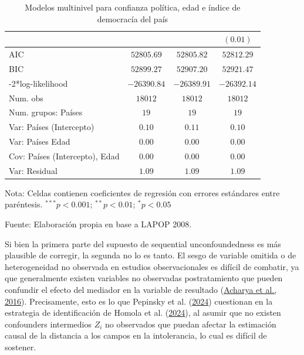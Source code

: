 \documentclass[
  12pt,
  a4paper,
]{article}
\begin{document}
\begin{table}[h!]
\begin{center}
{\begin{threeparttable}
\begin{tabular}{l c c c}
                               &               &               & $(0.01)$      \\
\midrule
AIC                            & $52805.69$    & $52805.82$    & $52812.29$    \\
BIC                            & $52899.27$    & $52907.20$    & $52921.47$    \\
-2*log-likelihood              & $-26390.84$   & $-26389.91$   & $-26392.14$   \\
Num. obs                       & $18012$       & $18012$       & $18012$       \\
Num. grupos: Países            & $19$          & $19$          & $19$          \\
Var: Países (Intercepto)       & $0.10$        & $0.11$        & $0.10$        \\
Var: Países Edad               & $0.00$        & $0.00$        & $0.00$        \\
Cov: Países (Intercepto), Edad & $0.00$        & $0.00$        & $0.00$        \\
Var: Residual                  & $1.09$        & $1.09$        & $1.09$        \\
\bottomrule
\end{tabular}
\begin{tablenotes}[flushleft]
\scriptsize{\item Nota: Celdas contienen coeficientes de regresión con errores estándares entre paréntesis. $^{***}p<0.001$; $^{**}p<0.01$; $^{*}p<0.05$ \\ \item Fuente: Elaboración propia en base a LAPOP 2008.}
\end{tablenotes}
\end{threeparttable}
}
\caption{\label{tab:table2} Modelos multinivel para confianza política, edad e índice de democracía del país}
\label{table:coefficients}
\end{center}
\end{table}

Si bien la primera parte del supuesto de sequential unconfoundedness es más plausible de corregir, la segunda no lo es tanto. El sesgo de variable omitida o de heterogeneidad no observada en estudios observacionales es difícil de combatir, ya que generalmente existen variables no observadas postratamiento que pueden confundir el efecto del mediador en la variable de resultado (\protect\hyperlink{ref-acharya_explaining_2016}{Acharya et al., 2016}). Precisamente, esto es lo que Pepinsky et al. (\protect\hyperlink{ref-pepinsky_causation_2024}{2024}) cuestionan en la estrategia de identificación de Homola et al. (\protect\hyperlink{ref-homola_fixed_2024}{2024}), al asumir que no existen confounders intermedios \(Z_i\) no observados que puedan afectar la estimación causal de la distancia a los campos en la intolerancia, lo cual es difícil de sostener.
\end{document}
